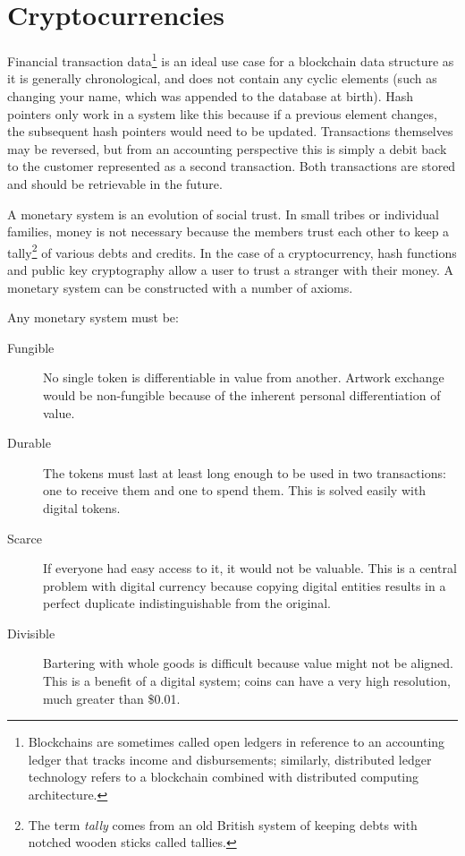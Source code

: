 \section{Cryptocurrencies}\label{Se:Cryptocurrencies}
Financial transaction data\footnote{Blockchains are sometimes called open ledgers in reference to an accounting ledger that tracks income and disbursements; similarly, distributed ledger technology refers to a blockchain combined with distributed computing architecture.} is an ideal use case for a blockchain data structure as it is generally chronological, and does not contain any cyclic elements (such as changing your name, which was appended to the database at birth). Hash pointers only work in a system like this because if a previous element changes, the subsequent hash pointers would need to be updated. Transactions themselves may be reversed, but from an  accounting perspective this is simply a debit back to the customer represented as a second transaction. Both transactions are stored and should be retrievable in the future.

A monetary system is an evolution of social trust. In small tribes or individual families, money is not necessary because the members trust each other to keep a tally\footnote{The term \emph{tally} comes from an old British system of keeping debts with notched wooden sticks called tallies.} of various debts and credits. In the case of a cryptocurrency, hash functions and public key cryptography allow a user to trust a stranger with their money. A monetary system can be constructed with a number of axioms.

Any monetary system must be:
	\begin{description}
	\item[Fungible] No single token is differentiable in value from another. Artwork exchange would be non-fungible because of the inherent personal differentiation of value.
	\item [Durable] The tokens must last at least long enough to be used in two transactions: one to receive them and one to spend them. This is solved easily with digital tokens.
	\item [Scarce] If everyone had easy access to it, it would not be valuable. This is a central problem with digital currency because copying digital entities results in a perfect duplicate indistinguishable from the original.
	\item [Divisible] Bartering with whole goods is difficult because value might not be aligned. This is a benefit of a digital system; coins can have a very high resolution, much greater than \$0.01.
	\end{description} 

